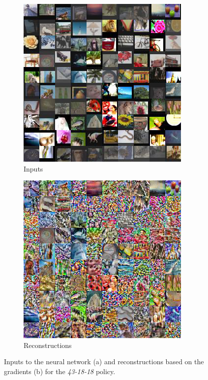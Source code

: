 \begin{figure}[hbt!]
\begin{subfigure}{.49\linewidth}\centering
\includegraphics[width=\textwidth]{grids/data_cifar100_arch_ResNet20-4_epoch_200_optim_inversed_mode_aug_auglist_43-18-18_rlabel_False_ORIGINALS.png}
\caption{Inputs}%
\end{subfigure}%
\hfill
\begin{subfigure}{.49\linewidth}\centering
\includegraphics[width=\textwidth]{grids/data_cifar100_arch_ResNet20-4_epoch_200_optim_inversed_mode_aug_auglist_43-18-18_rlabel_False_RECONSTRUCTIONS.png}
\caption{Reconstructions}%
\end{subfigure}%
\caption{Inputs to the neural network (a) and reconstructions based on the gradients (b) for the \textit{43-18-18} policy.}
    \label{fig:apprr3}
\end{figure}
